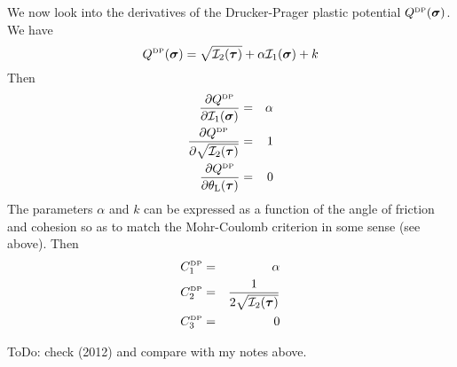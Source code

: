 \vspace{.5cm}

We now look into the derivatives of the Drucker-Prager plastic potential $Q^{\text{\tiny DP}}(\bm\sigma)$.
We have
\[
Q^{\text{\tiny DP}} (\bm\sigma)= \sqrt{{\cal I}_2({\bm \tau})} + \alpha {\cal I}_1({\bm \sigma}) + k 
\]
Then
\begin{eqnarray}
\frac{\partial Q^{\text{\tiny DP}} }{\partial {\cal I}_1(\bm\sigma)} &=& \alpha \\
\frac{\partial Q^{\text{\tiny DP}} }{\partial \sqrt{{\cal I}_2(\bm\tau)}}&=& 1  \\
\frac{\partial Q^{\text{\tiny DP}} }{\partial \theta_{\rm L}(\bm\tau)} &=& 0 
\end{eqnarray}
The parameters $\alpha$ and $k$ can be expressed as a function of the angle of friction 
and cohesion so as to match the Mohr-Coulomb criterion in some sense (see above).
Then
\begin{eqnarray}
C_1^{\text{\tiny DP}} &=& \alpha  \\ 
C_2^{\text{\tiny DP}} &=& \frac{1}{2  \sqrt{{\cal I}_2(\bm\tau)}   }  \\ 
C_3^{\text{\tiny DP}} &=& 0  
\end{eqnarray}

ToDo: check \textcite{albo12} (2012) and compare with my notes above.









\newpage
